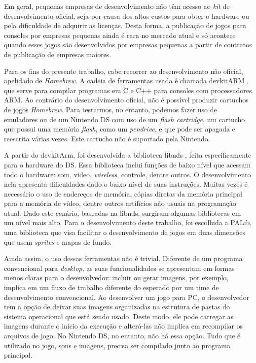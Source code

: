 \documentclass[brazil]{abnt}
\begin{document}
Em geral, pequenas empresas de desenvolvimento não têm acesso ao \textit{kit} de desenvolvimento oficial, seja por causa dos altos custos para obter o hardware ou pela dificuldade de adquirir as licenças. Desta forma, a publicação de jogos para consoles por empresas pequenas ainda é rara no mercado atual e só acontece quando esses jogos são desenvolvidos por empresas pequenas a partir de contratos de publicação de empresas maiores. \cite{Nplus}

Para os fins do presente trabalho, cabe recorrer ao desenvolvimento não oficial, apelidado de \textit{Homebrew}. A cadeia de ferramentas usada é chamada devkitARM \cite{devkitARM}, que serve para compilar programas em C e C++ para consoles com processadores ARM. Ao contrário do desenvolvimento oficial, não é possível produzir cartuchos de jogos \textit{Homebrew}. Para testarmos, no entanto, podemos fazer uso de emuladores ou de um Nintendo DS com uso de um \textit{flash cartridge}, um cartucho que possui uma memória \textit{flash}, como um \textit{pendrive}, e que pode ser apagada e reescrita várias vezes. Este cartucho não é suportado pela Nintendo.

A partir do devkitArm, foi desenvolvida a biblioteca libnds \cite{libnds}, feita especificamente para o hardware do DS. Essa biblioteca inclui funções de baixo nível que acessam todo o hardware: som, video, \textit{wireless}, controle, dentre outros. O desenvolvimento nela apresenta dificuldades dado o baixo nível de suas instruções. Muitas vezes é necessário o uso de endereços de memória, cópias diretas da memória principal para a memória de vídeo, dentre outros artifícios não usuais na programação atual. Dado este cenário, baseadas na libnds, surgiram algumas bibliotecas em um nível mais alto. Para o desenvolvimento deste trabalho, foi escolhida a PALib, uma biblioteca que visa facilitar o desenvolvimento de jogos em duas dimensões que usem \textit{sprites} e mapas de fundo.

Ainda assim, o uso dessas ferramentas não é trivial. Diferente de um programa convencional para \textit{desktop}, as suas funcionalidades se apresentam em formas menos claras para o desenvolvedor: incluir ou gerar imagens, por exemplo, implica em um fluxo de trabalho diferente do esperado por um time de desenvolvimento convencional. Ao desenvolver um jogo para PC, o desenvolvedor tem a opção de deixar suas imagens organizadas na estrutura de pastas do sistema operacional que está sendo usado. Deste modo, ele pode carregar as imagens durante o início da execução e alterá-las não implica em recompilar os arquivos de jogo. No Nintendo DS, no entanto, não há essa opção. Tudo que é utilizado no jogo, sons e imagens, precisa ser compilado junto ao programa principal.
\end{document}
